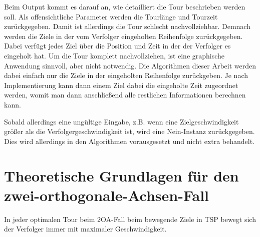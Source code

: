 \documentclass[german,version-2019-11]{uzl-thesis}
\begin{document}
Beim Output kommt es darauf an, wie detailliert die Tour beschrieben werden soll. Als offensichtliche Parameter werden die Tourlänge und Tourzeit zurückgegeben. Damit ist allerdings die Tour schlecht nachvollziehbar. Demnach werden die Ziele in der vom Verfolger eingeholten Reihenfolge zurückgegeben. Dabei verfügt jedes Ziel über die Position und Zeit in der der Verfolger es eingeholt hat. Um die Tour komplett nachvollziehen, ist eine graphische Anwendung sinnvoll, aber nicht notwendig. 
Die Algorithmen dieser Arbeit werden dabei einfach nur die Ziele in der eingeholten Reihenfolge zurückgeben. Je nach Implementierung kann dann einem Ziel dabei die eingeholte Zeit zugeordnet werden, womit man dann anschließend alle restlichen Informationen berechnen kann. 

Sobald allerdings eine ungültige Eingabe, z.B. wenn eine Zielgeschwindigkeit größer als die Verfolgergeschwindigkeit ist, wird eine \glqq Nein\grqq-Instanz zurückgegeben. Dies wird allerdings in den Algorithmen vorausgesetzt und nicht extra behandelt. 

\chapter{Theoretische Grundlagen für den zwei-orthogonale-Achsen-Fall}

\begin{lemma}
In jeder optimalen Tour beim 2OA-Fall beim bewegende Ziele in TSP bewegt sich der Verfolger immer mit maximaler Geschwindigkeit.
\end{lemma}
 
\end{document}

